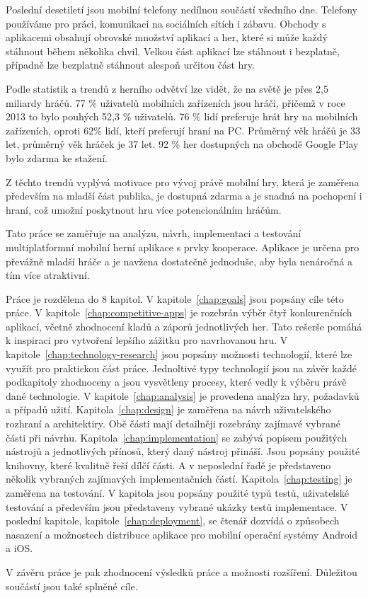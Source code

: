 \begin{introduction}
Poslední desetiletí jsou mobilní telefony nedílnou součástí všedního dne.
Telefony používáme pro práci, komunikaci na sociálních sítích i zábavu.
Obchody s aplikacemi obsahují obrovské množství aplikací a her,
které si může každý stáhnout během několika chvil.
Velkou část aplikací lze stáhnout i bezplatně,
případně lze bezplatně stáhnout alespoň určitou část hry.

Podle statistik a trendů z herního odvětví \cite{wepc_video_game_statistics}
lze vidět,
že na světě je přes 2,5 miliardy hráčů.
77 \% uživatelů mobilních zařízeních jsou hráči,
přičemž v roce 2013 to bylo pouhých 52,3 \% uživatelů.
76 \% lidí preferuje hrát hry na mobilních zařízeních,
oproti 62\% lidí, kteří preferují hraní na PC.
Průměrný věk hráčů je 33 let, průměrný věk hráček je 37 let.
92 \% her dostupných na obchodě Google Play bylo zdarma ke stažení.

Z těchto trendů vyplývá motivace pro vývoj právě mobilní hry,
která je zaměřena především na mladší část publika,
je dostupná zdarma a je snadná na pochopení i hraní,
což umožní poskytnout hru více potencionálním hráčům.

Tato práce se zaměřuje na analýzu, návrh, implementaci a testování
multiplatformní mobilní herní aplikace s prvky kooperace.
Aplikace je určena pro převážně mladší hráče
a je navžena dostatečně jednoduše,
aby byla nenáročná a tím více atraktivní.

Práce je rozdělena do 8 kapitol.
V kapitole~\ref{chap:goals} jsou popsány cíle této práce.
V kapitole~\ref{chap:competitive-apps} je rozebrán výběr čtyř konkurenčních aplikací,
včetně zhodnocení kladů a záporů jednotlivých her.
Tato rešerše pomáhá k inspiraci pro vytvoření lepšího zážitku pro navrhovanou
hru.
V kapitole~\ref{chap:technology-research} jsou popsány možnosti technologií,
které lze využít pro praktickou část práce.
Jednoltivé typy technologií jsou na závěr každé podkapitoly zhodnoceny
a jsou vysvětleny procesy, které vedly k výběru právě dané technologie.
V kapitole~\ref{chap:analysis} je provedena analýza hry, požadavků a případů užití.
Kapitola~\ref{chap:design} je zaměřena na návrh uživatelského rozhraní a architektiry.
Obě části mají detailněji rozebrány zajímavé vybrané části při návrhu.
Kapitola~\ref{chap:implementation} se zabývá popisem použitých nástrojů
a jednotlivých přínosů, který daný nástroj přináší.
Jsou popsány použité knihovny, které kvalitně řeší dílčí části.
A v neposlední řadě je představeno několik vybraných zajímavých
implementačních částí.
Kapitola~\ref{chap:testing} je zaměřena na testování.
V kapitola jsou popsány použité typů testů,
uživatelské testování a především jsou představeny vybrané ukázky testů
implementace.
V poslední kapitole, kapitole~\ref{chap:deployment}, se čtenář dozvídá o způsobech nasazení a
možnostech distribuce aplikace pro mobilní operační systémy Android a iOS.

V závěru práce je pak zhodnocení výsledků práce a možnosti rozšíření.
Důležitou součástí jsou také splněné cíle.
\end{introduction}
